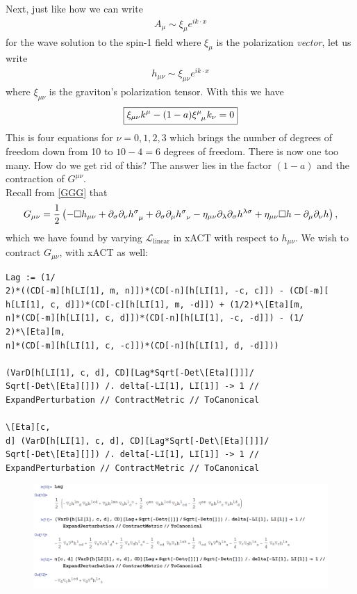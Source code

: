 \documentclass{book}
\theoremstyle{definition}
\newcommand{\p}{\partial}
\newcommand{\lag}{\mathcal{L}}
\newcommand{\f}[2]{\frac{#1}{#2}}
\newcommand{\lp}{\left(}
\newcommand{\rp}{\right)}
\begin{document}
Next, just like how we can write 
\begin{align}
A_\mu \sim \xi_\mu e^{ik\cdot x}
\end{align}
for the wave solution to the spin-1 field where $\xi_\mu$ is the polarization \textit{vector}, let us write
\begin{align}
h_{\mu\nu} \sim \xi_{\mu\nu}e^{ik\cdot x}
\end{align}
where $\xi_{\mu\nu}$ is the graviton's polarization tensor. With this we have
\begin{align}
\boxed{\xi_{\mu\nu}k^\mu - (1-a)\tensor{\xi}{^\mu_\mu}k_\nu = 0}
\end{align}
This is four equations for $\nu = 0,1,2,3$ which brings the number of degrees of freedom down from 10 to $10 - 4 = 6$ degrees of freedom. There is now one too many. How do we get rid of this? The answer lies in the factor $(1-a)$ and the contraction of $G^{\mu\nu}$.\\

Recall from \eqref{GGG} that
\begin{align}
G_{\mu\nu} = \f{1}{2}\lp -\square h_{\mu\nu} + \p_\sigma \p_\nu \tensor{h}{^\sigma_\mu}  
+ \p_\sigma \p_\mu \tensor{h}{^\sigma_\nu} 
- \eta_{\mu\nu}\p_\lambda \p_\sigma h^{\lambda\sigma} + \eta_{\mu\nu}\square h - \p_\mu\p_\nu h\rp,
\end{align}
which we have found by varying $\lag_{\text{linear}}$ in xACT with respect to $h_{\mu\nu}$. We wish to contract $G_{\mu\nu}$, with xACT as well:
\begin{lstlisting}
Lag := (1/
2)*((CD[-m][h[LI[1], m, n]])*(CD[-n][h[LI[1], -c, c]]) - (CD[-m][
h[LI[1], c, d]])*(CD[-c][h[LI[1], m, -d]]) + (1/2)*\[Eta][m, 
n]*(CD[-m][h[LI[1], c, d]])*(CD[-n][h[LI[1], -c, -d]]) - (1/
2)*\[Eta][m, 
n]*(CD[-m][h[LI[1], c, -c]])*(CD[-n][h[LI[1], d, -d]]))

(VarD[h[LI[1], c, d], CD][Lag*Sqrt[-Det\[Eta][]]]/
Sqrt[-Det\[Eta][]]) /. delta[-LI[1], LI[1]] -> 1 // 
ExpandPerturbation // ContractMetric // ToCanonical

\[Eta][c, 
d] (VarD[h[LI[1], c, d], CD][Lag*Sqrt[-Det\[Eta][]]]/
Sqrt[-Det\[Eta][]]) /. delta[-LI[1], LI[1]] -> 1 // 
ExpandPerturbation // ContractMetric // ToCanonical
\end{lstlisting}
\begin{figure}[!htb]
	\centering
	\includegraphics[scale=0.28]{Gcontract}
\end{figure}
\end{document}
